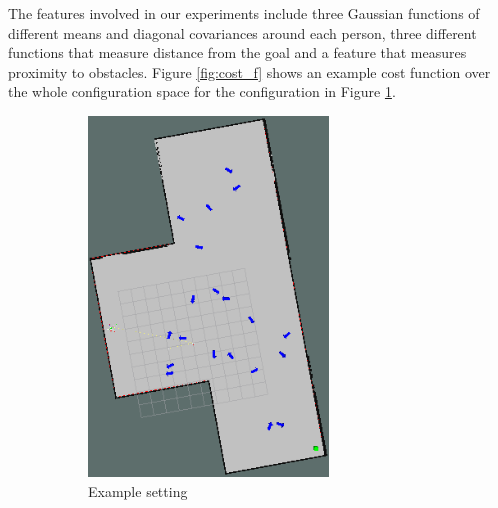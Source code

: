 \documentclass[a4paper,11pt]{report}
\begin{document}
	The features involved in our experiments include three Gaussian functions of different means and diagonal covariances around each person, three different functions that measure distance from the goal and a feature that measures proximity to obstacles. Figure \ref{fig:cost_f} shows an example cost function over the whole configuration space for the configuration in Figure \ref{fig:exp_setting}.


	\begin{figure}[tbh]
  \centering
      \begin{subfigure}[b]{0.435\columnwidth}
	\hspace{5mm}
    \includegraphics[width=0.7\textwidth]{figures/people.png}
    \caption{Example setting }
    \label{fig:exp_setting}
  \end{subfigure}
  \hspace{10mm}
  \begin{subfigure}[b]{0.435\columnwidth}
  \hspace{4mm}

\end{subfigure}
\end{figure}
\end{document}
